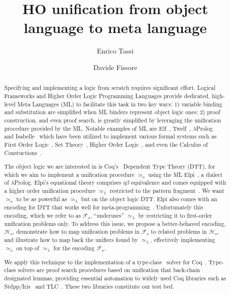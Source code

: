 \documentclass[sigconf,natbib=false]{acmart}
\newcommand{\UnifRel}{\ensuremath{\simeq}}
\newcommand{\Uo}{\ensuremath{\UnifRel_o}\xspace}
\newcommand{\Ue}{\ensuremath{\UnifRel_\lambda}\xspace}
\newcommand{\Fo}{\ensuremath{\mathcal{F}_{\!o}\xspace}} %
\newcommand{\Ho}{\ensuremath{\mathcal{H}_o}\xspace}
\begin{document}
\title{HO unification from object language to meta language} 

\author{Enrico Tassi}

\author{Davide Fissore}

\begin{abstract}
  Specifying and implementing a logic from scratch requires significant effort.
  Logical Frameworks and Higher Order Logic Programming Languages provide
  dedicated, high-level Meta Languages (ML) to facilitate this task in two
  key ways: 1) variable binding and substitution are simplified when ML binders
  represent object logic ones; 2) proof construction, and even proof search, is
  greatly simplified by leveraging the unification procedure provided by the ML.
  Notable examples of ML are Elf~\cite{elf}, Twelf~\cite{twelf},
  $\lambda$Prolog~\cite{miller_nadathur_2012} and
  Isabelle~\cite{10.1007/978-3-540-71067-7_7}
  which have been utilized to implement various formal systems such as
  First Order Logic~\cite{felty88cade},
  Set Theory~\cite{10.1007/BF00881873},
  Higher Order Logic~\cite{books/sp/NipkowPW02}, and even the Calculus of
  Constuctions~\cite{felty93lics}.
  
  The object logic we are interested in is Coq's~\cite{Coq-refman}
  Dependent Type Theory (DTT),
  for which we aim to implement a unification procedure \Uo using the ML
  Elpi~\cite{dunchev15lpar}, a dialect of $\lambda$Prolog.
  Elpi's equational theory comprises
  $\eta\beta$ equivalence and comes equipped with a
  higher order unification procedure \Ue restricted to the pattern
  fragment~\cite{miller92jsc}.
  We want \Uo to be as powerful as \Ue but on the object logic DTT.
  Elpi also comes with an encoding for DTT that works well
  for meta-programming~\cite{tassi:hal-01637063,tassi:hal-01897468,gregoire:hal-03800154,newtc}.
  Unfortunately this encoding, which we refer to as \Fo,
  ``underuses'' \Ue by restricting it to first-order unification problems only. 
  To address this issue, we propose a better-behaved encoding, \Ho,
  demonstrate how to map unification problems in \Fo{}
  to related problems in \Ho, and illustrate
  how to map back the unifiers found by \Ue, effectively implementing
   \Uo on top of \Ue for the encoding \Fo.
   
  We apply this technique to the implementation of a type-class~\cite{wadler89}
  solver for Coq~\cite{Coq-refman}.
  Type-class solvers are proof search procedures based on
  unification that back-chain designated lemmas, providing essential
  automation to widely used 
  Coq libraries such as Stdpp/Iris~\cite{JUNG_KREBBERS_JOURDAN_BIZJAK_BIRKEDAL_DREYER_2018}
  and TLC~\cite{10.1007/978-3-642-14052-5_15}. These two libraries
  constitute our test bed.
\end{abstract} 
\end{document}
